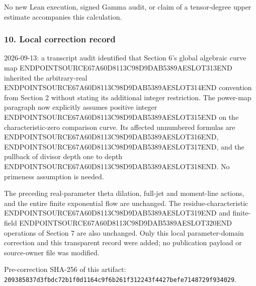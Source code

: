 No new Lean execution, signed Gamma audit, or claim of a tensor-degree upper estimate accompanies this calculation.

\subsubsection{10. Local correction record}\label{endpoint-f1_scaling--local-correction-record}

2026-09-13: a transcript audit identified that Section 6's global algebraic curve map ENDPOINTSOURCE67A60D8113C98D9DAB5389AESLOT313END inherited the arbitrary-real ENDPOINTSOURCE67A60D8113C98D9DAB5389AESLOT314END convention from Section 2 without stating its additional integer restriction. The power-map paragraph now explicitly assumes positive integer ENDPOINTSOURCE67A60D8113C98D9DAB5389AESLOT315END on the characteristic-zero comparison curve. Its affected unnumbered formulas are ENDPOINTSOURCE67A60D8113C98D9DAB5389AESLOT316END, ENDPOINTSOURCE67A60D8113C98D9DAB5389AESLOT317END, and the pullback of divisor depth one to depth ENDPOINTSOURCE67A60D8113C98D9DAB5389AESLOT318END. No primeness assumption is needed.

The preceding real-parameter theta dilation, full-jet and moment-line actions, and the entire finite exponential flow are unchanged. The residue-characteristic ENDPOINTSOURCE67A60D8113C98D9DAB5389AESLOT319END and finite-field ENDPOINTSOURCE67A60D8113C98D9DAB5389AESLOT320END operations of Section 7 are also unchanged. Only this local parameter-domain correction and this transparent record were added; no publication payload or source-owner file was modified.

Pre-correction SHA-256 of this artifact: \texttt{209385837d3fbdc72b1f0d1164c9f6b261f312243f4427befe7148729f934029}.

